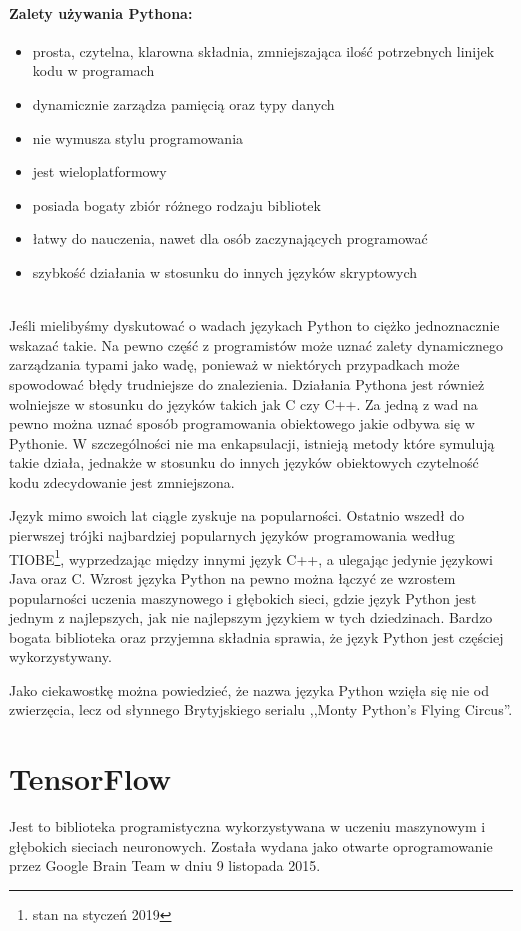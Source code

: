 \documentclass[a4paper,12pt,twoside,openany]{report}
\begin{document}
\paragraph{Zalety używania Pythona:}
\begin{itemize} 
	\item prosta, czytelna, klarowna składnia, zmniejszająca ilość potrzebnych linijek kodu w programach
	\item dynamicznie zarządza pamięcią oraz typy danych
	\item nie wymusza stylu programowania
	\item jest wieloplatformowy
	\item posiada bogaty zbiór różnego rodzaju bibliotek
	\item łatwy do nauczenia, nawet dla osób zaczynających programować
	\item szybkość działania w stosunku do innych języków skryptowych\cite{python}
\end{itemize} 
\mbox{} \\
Jeśli mielibyśmy dyskutować o wadach językach Python to ciężko jednoznacznie wskazać takie. Na pewno część z programistów może uznać zalety dynamicznego zarządzania typami jako wadę, ponieważ w niektórych przypadkach może spowodować błędy trudniejsze do znalezienia. Działania Pythona jest również wolniejsze w stosunku do języków takich jak C czy C++.  Za jedną z wad na pewno można uznać sposób programowania obiektowego jakie odbywa się w Pythonie. W szczególności nie ma enkapsulacji, istnieją metody które symulują takie działa, jednakże w stosunku do innych języków  obiektowych czytelność kodu zdecydowanie jest zmniejszona.

Język mimo swoich lat ciągle zyskuje na popularności. Ostatnio wszedł do pierwszej trójki najbardziej popularnych języków programowania według TIOBE\footnote{stan na styczeń 2019}\cite{tiobe}, wyprzedzając między innymi język C++, a ulegając jedynie językowi Java oraz C. Wzrost języka Python na pewno można łączyć ze wzrostem popularności uczenia maszynowego i głębokich sieci, gdzie język Python jest jednym z najlepszych, jak nie najlepszym językiem w tych dziedzinach. Bardzo bogata biblioteka oraz przyjemna składnia sprawia, że język Python jest częściej wykorzystywany.  

Jako ciekawostkę można powiedzieć, że nazwa języka Python wzięła się nie od zwierzęcia, lecz od słynnego Brytyjskiego serialu ,,Monty Python’s Flying Circus''\cite{python1}.

\section{TensorFlow}
Jest to biblioteka programistyczna wykorzystywana w uczeniu maszynowym i głębokich sieciach neuronowych. Została wydana jako otwarte oprogramowanie przez Google Brain Team w dniu 9 listopada 2015\cite{tensorflow}.
\end{document}
